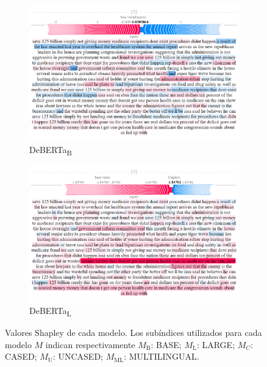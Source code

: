 \begin{figure}[ht]
    \begin{subfigure}[t]{0.4\textwidth}
        \includegraphics[width=\textwidth]{figs/all_F/deberta-b.png}
        \caption{{DeBERTa}\textsubscript{B}}
    \end{subfigure}
    \hspace{\fill} %
    \begin{subfigure}[t]{0.4\textwidth}
        \includegraphics[width=\linewidth]{figs/all_F/deberta-l.png}
        \caption{{DeBERTa}\textsubscript{L}}
    \end{subfigure}    
    
    \caption{Valores Shapley de cada modelo. Los subíndices utilizados para cada modelo $M$ indican respectivamente $M_{\text{B}}$: BASE; $M_{\text{L}}$: LARGE; $M_{C}$: CASED; $M_{\text{U}}$: UNCASED; $M_{\text{ML}}$: MULTILINGUAL.}
\end{figure}


